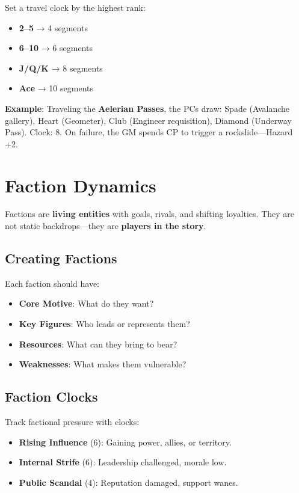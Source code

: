 Set a travel clock by the highest rank:
\begin{itemize}
    \item \textbf{2--5} → 4 segments
    \item \textbf{6--10} → 6 segments
    \item \textbf{J/Q/K} → 8 segments
    \item \textbf{Ace} → 10 segments
\end{itemize}

\textbf{Example}: Traveling the \textbf{Aelerian Passes}, the PCs draw: Spade (Avalanche gallery), Heart (Geometer), Club (Engineer requisition), Diamond (Underway Pass). Clock: 8. On failure, the GM spends CP to trigger a rockslide---Hazard +2.

\section*{Faction Dynamics}

Factions are \textbf{living entities} with goals, rivals, and shifting loyalties. They are not static backdrops---they are \textbf{players in the story}.

\subsection*{Creating Factions}

Each faction should have:

\begin{itemize}
    \item \textbf{Core Motive}: What do they want?
    \item \textbf{Key Figures}: Who leads or represents them?
    \item \textbf{Resources}: What can they bring to bear?
    \item \textbf{Weaknesses}: What makes them vulnerable?
\end{itemize}

\subsection*{Faction Clocks}

Track factional pressure with clocks:

\begin{itemize}
    \item \textbf{Rising Influence} (6): Gaining power, allies, or territory.
    \item \textbf{Internal Strife} (6): Leadership challenged, morale low.
    \item \textbf{Public Scandal} (4): Reputation damaged, support wanes.
\end{itemize}

